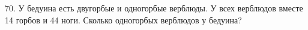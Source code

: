 70. У бедуина есть двугорбые и одногорбые верблюды. У всех верблюдов вместе 14 горбов и 44 ноги. Сколько одногорбых верблюдов у бедуина?\\
